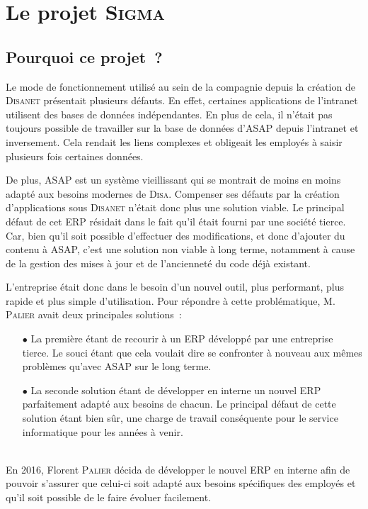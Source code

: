 \section{Le projet \textsc{Sigma}}

\subsection{Pourquoi ce projet~?}

Le mode de fonctionnement utilisé au sein de la compagnie depuis la création de \textsc{Disanet} présentait plusieurs défauts.
En effet, certaines applications de l'intranet utilisent des bases de données indépendantes.
En plus de cela, il n'était pas toujours possible de travailler sur la base de données d'ASAP depuis l'intranet et inversement.
Cela rendait les liens complexes et obligeait les employés à saisir plusieurs fois certaines données.

De plus, ASAP est un système vieillissant qui se montrait de moins en moins adapté aux besoins modernes de \textsc{Disa}.
Compenser ses défauts par la création d'applications sous \textsc{Disanet} n'était donc plus une solution viable.
Le principal défaut de cet ERP résidait dans le fait qu'il était fourni par une société tierce.
Car, bien qu'il soit possible d'effectuer des modifications, et donc d'ajouter du contenu à ASAP, c'est une solution non viable à long terme, notamment à cause de la gestion des mises à jour et de l’ancienneté du code déjà existant.

L'entreprise était donc dans le besoin d'un nouvel outil, plus performant, plus rapide et plus simple d'utilisation.
Pour répondre à cette problématique, M. \textsc{Palier} avait deux principales solutions~:~
\\
\begin{itemize}
    \item[\tiny$\bullet$] La première étant de recourir à un ERP développé par une entreprise tierce.
    Le souci étant que cela voulait dire se confronter à nouveau aux mêmes problèmes qu'avec ASAP sur le long terme.
    \item[\tiny$\bullet$] La seconde solution étant de développer en interne un nouvel ERP parfaitement adapté aux besoins de chacun.
    Le principal défaut de cette solution étant bien sûr, une charge de travail conséquente pour le service informatique pour les années à venir.
\end{itemize}
~\\

En 2016, Florent \textsc{Palier} décida de développer le nouvel ERP en interne afin de pouvoir s'assurer que celui-ci soit adapté aux besoins spécifiques des employés et qu'il soit possible de le faire évoluer facilement.

